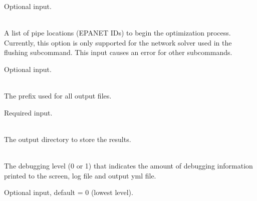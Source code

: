 \begin{description}[topsep=0pt,parsep=0.5em,itemsep=-0.4em]
\begin{description}[topsep=0pt,parsep=0.5em,itemsep=-0.4em]
\begin{description}[topsep=0pt,parsep=0.5em,itemsep=-0.4em]
        Optional input.
      \item[{pipes}]\hfill
\\A list of pipe locations (EPANET IDs) to begin the optimization
        process. Currently, this option is only supported for the
        network solver used in the flushing subcommand. This input causes an error for other subcommands.
        
        Optional input.
    \end{description}
  \end{description}
  \item[{configure}]\hfill
  \begin{description}[topsep=0pt,parsep=0.5em,itemsep=-0.4em]
    \item[{output prefix}]\hfill
\\The prefix used for all output files.
                
                Required input.
    \item[{output directory}]\hfill
      \\The output directory to store the results.
    \item[{debug}]\hfill
\\The debugging level (0 or 1) that indicates the amount of debugging 
                information printed to the screen, log file and output yml file. 
                
                Optional input, default = 0 (lowest level).
  \end{description}
\end{description}
